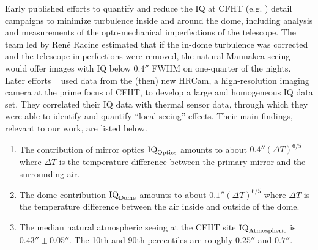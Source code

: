 Early published efforts to quantify and reduce the IQ at CFHT (e.g. \cite{racine1984}) detail campaigns to minimize turbulence inside and around the dome, including analysis and measurements of the opto-mechanical imperfections of the telescope. The team led by Ren\'e Racine estimated that if the in-dome turbulence was corrected and the telescope imperfections were removed, the natural Maunakea seeing would  offer images with IQ below $0.4''$ FWHM on one-quarter of the nights. Later efforts ~\citep{racine1991mirror} used data from the (then) new HRCam, a high-resolution imaging camera at the prime focus of CFHT, to develop a large and homogeneous IQ data set. They correlated their IQ data with thermal sensor data, through which they were able to identify and quantify ``local seeing'' effects.  Their main findings, relevant to our work, are listed below.
\begin{enumerate}
\item The contribution of mirror optics $\textrm{IQ}_{\textrm{Optics}}$ amounts to about $0.4'' (\Delta T)^{6/5}$ where $\Delta T$ is the temperature difference between the primary mirror and the surrounding air.
\item The dome contribution $\textrm{IQ}_{\textrm{Dome}}$ amounts to about $0.1'' (\Delta T)^{6/5}$ where $\Delta T$ is the temperature difference between the air inside and outside of the dome.
\item The median natural atmospheric seeing at the CFHT site $\textrm{IQ}_{\textrm{Atmospheric}}$ is $0.43'' \pm 0.05''$.  The 10th and 90th percentiles are roughly $0.25''$ and $0.7''$.
\end{enumerate}

